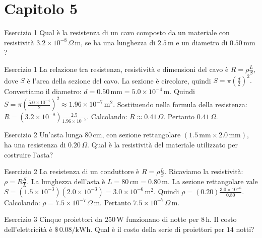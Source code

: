 \documentclass[a4paper]{article}
\begin{document}
\section{Capitolo 5}
\begin{snippetexercise}{Esercizio 1}
    Qual è la resistenza di un cavo composto da un materiale con resistività
    \(3.2 \times 10^{-8}\,\Omega\,\mathrm{m}\), se ha una lunghezza di
    \(2.5\,\mathrm{m}\) e un diametro di \(0.50\,\mathrm{mm}\)?

\end{snippetexercise}
\begin{snippetsolution}{Esercizio 1}
    La relazione tra resistenza, resistività e dimensioni del cavo è
    \(R = \rho \frac{L}{S},\)
    dove \(S\) è l'area della sezione del cavo.
    La sezione è circolare, quindi
    \(S = \pi\left(\frac{d}{2}\right)^2.\)
    Convertiamo il diametro:
    \(d = 0.50\,\mathrm{mm} = 5.0 \times 10^{-4}\,\mathrm{m}.\)
    Quindi
    \(S = \pi \left( \frac{5.0 \times 10^{-4}}{2} \right)^2 \approx 1.96 \times 10^{-7}\,\mathrm{m^2}.\)
    Sostituendo nella formula della resistenza:
    \(R = \left(3.2 \times 10^{-8}\right) \frac{2.5}{1.96 \times 10^{-7}}.\)
    Calcolando:
    \(R \approx 0.41\,\Omega.\)
    Pertanto
    \(\boxed{0.41\,\Omega}.\)
\end{snippetsolution}
\begin{snippetexercise}{Esercizio 2}
    Un'asta lunga \(80\,\mathrm{cm}\), con sezione rettangolare
    \((1.5\,\mathrm{mm} \times 2.0\,\mathrm{mm})\), ha una resistenza di
    \(0.20\,\Omega\). Qual è la resistività del materiale utilizzato per
    costruire l'asta?

\end{snippetexercise}
\begin{snippetsolution}{Esercizio 2}
    La resistenza di un conduttore è
    \(R = \rho \frac{L}{S}.\)
    Ricaviamo la resistività:
    \(\rho = R\frac{S}{L}.\)
    La lunghezza dell'asta è
    \(L = 80\,\mathrm{cm} = 0.80\,\mathrm{m}.\)
    La sezione rettangolare vale
    \(S = (1.5 \times 10^{-3}) (2.0 \times 10^{-3}) = 3.0 \times 10^{-6}\,\mathrm{m^2}.\)
    Quindi
    \(\rho = (0.20) \frac{3.0 \times 10^{-6}}{0.80}.\)
    Calcolando:
    \(\rho = 7.5 \times 10^{-7}\,\Omega\,\mathrm{m}.\)
    Pertanto
    \(\boxed{7.5 \times 10^{-7}\,\Omega\,\mathrm{m}}.\)
\end{snippetsolution}
\begin{snippetexercise}{Esercizio 3}
    Cinque proiettori da \(250\,\mathrm{W}\) funzionano di notte per
    \(8\,\mathrm{h}\). Il costo dell'elettricità è
    \(\$\,0.08/\mathrm{kWh}\). Qual è il costo della serie di proiettori per
    \(14\) notti?

\end{snippetexercise}
\end{document}
